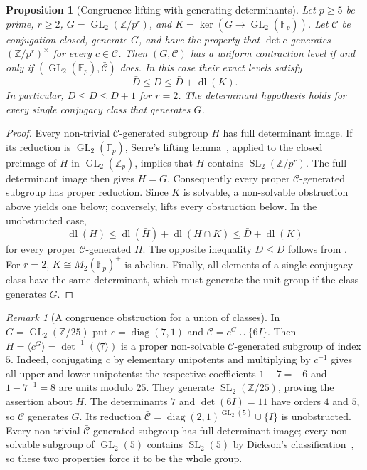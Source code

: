 \documentclass[11pt]{amsart}
\newtheorem{proposition}[proposition]{Proposition}
\theoremstyle{definition}
\theoremstyle{remark}
\newtheorem{remark}[remark]{Remark}
\theoremstyle{plain}
\theoremstyle{plain}
\numberwithin{equation}{section}
\DeclareMathOperator{\GL}{GL}
\DeclareMathOperator{\SL}{SL}
\newcommand{\F}{\mathbb{F}}
\newcommand{\Z}{\mathbb{Z}}
\begin{document}
\begin{proposition}[Congruence lifting with generating determinants]
\label{prop:congruence-class}
Let $p\ge5$ be prime, $r\ge2$, $G=\GL_2(\Z/p^r)$, and
$K=\ker(G\to\GL_2(\F_p))$. Let $\mathcal C$ be conjugation-closed,
generate $G$, and have the property that $\det c$ generates
$(\Z/p^r)^\times$ for every $c\in\mathcal C$.
Then $(G,\mathcal C)$ has a uniform contraction level if and only if
$(\GL_2(\F_p),\bar{\mathcal C})$ does. In this case their exact levels
satisfy
\[
 \bar D\le D\le\bar D+\operatorname{dl}(K).
\]
In particular, $\bar D\le D\le\bar D+1$ for $r=2$.
The determinant hypothesis holds for every single conjugacy class
that generates $G$.
\end{proposition}
\begin{proof}
Every non-trivial $\mathcal C$-generated subgroup $H$ has full
determinant image. If its reduction is $\GL_2(\F_p)$, Serre's lifting
lemma~\cite[Lemma 3.15]{Lombardo2015}, applied to the closed preimage of
$H$ in $\GL_2(\Z_p)$, implies that $H$ contains $\SL_2(\Z/p^r)$.
The full determinant image then gives $H=G$. Consequently every proper
$\mathcal C$-generated subgroup has proper reduction. Since $K$ is
solvable, a non-solvable obstruction above yields one below; conversely,
 lifts every obstruction below.
In the unobstructed case,
\[
 \operatorname{dl}(H)\le
 \operatorname{dl}(\bar H)+\operatorname{dl}(H\cap K)
 \le\bar D+\operatorname{dl}(K)
\]
for every proper $\mathcal C$-generated $H$. The opposite inequality
$\bar D\le D$ follows from .
For $r=2$, $K\cong M_2(\F_p)^+$ is abelian. Finally, all elements of
a single conjugacy class have the same determinant, which must generate
the unit group if the class generates $G$.
\end{proof}

\begin{remark}[A congruence obstruction for a union of classes]
\label{rem:congruence-supplement}
In $G=\GL_2(\Z/25)$ put $c=\operatorname{diag}(7,1)$ and
$\mathcal C=c^G\cup\{6I\}$. Then
$H=\langle c^G\rangle=\det^{-1}(\langle7\rangle)$ is a proper
non-solvable $\mathcal C$-generated subgroup of index $5$.
Indeed, conjugating $c$ by elementary unipotents and multiplying by
$c^{-1}$ gives all upper and lower unipotents: the respective
coefficients $1-7=-6$ and $1-7^{-1}=8$ are units modulo $25$.
They generate $\SL_2(\Z/25)$, proving the assertion about $H$.
The determinants $7$ and $\det(6I)=11$ have orders $4$ and $5$, so
$\mathcal C$ generates $G$.
Its reduction $\bar{\mathcal C}=\operatorname{diag}(2,1)^{\GL_2(5)}
\cup\{I\}$ is unobstructed. Every non-trivial
$\bar{\mathcal C}$-generated subgroup has full determinant image;
every non-solvable subgroup of $\GL_2(5)$ contains $\SL_2(5)$ by
Dickson's classification~\cite[Theorem 3.13]{Lombardo2015}, so these
two properties force it to be the whole group.
\end{remark}
\end{document}
